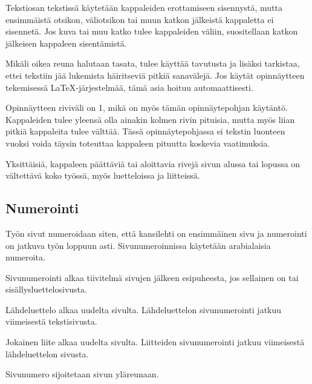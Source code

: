 Tekstiosan tekstissä käytetään kappaleiden erottamiseen sisennystä,
mutta ensimmäistä otsikon, väliotsikon tai muun katkon jälkeistä
kappaletta ei sisennetä. Jos kuva tai muu katko tulee kappaleiden
väliin, suositellaan katkon jälkeisen kappaleen sisentämistä.

Mikäli oikea reuna halutaan tasata, tulee käyttää tavutusta ja lisäksi
tarkistaa, ettei tekstiin jää lukemista häiritseviä pitkiä sanavälejä. Jos
käytät opinnäytteen tekemisessä \LaTeX-järjestelmää, 
tämä asia hoituu automaattisesti.

Opinnäytteen riviväli on 1, mikä on myös tämän opinnäytepohjan käytäntö. 
Kappaleiden tulee yleensä olla ainakin kolmen rivin pituisia, mutta
myös liian pitkiä kappaleita tulee välttää.  Tässä opinnäytepohjassa
ei tekstin luonteen vuoksi voida täysin toteuttaa kappaleen pituutta koskevia
vaatimuksia.

Yksittäisiä, kappaleen päättäviä tai aloittavia rivejä sivun alussa
tai lopussa on vältettävä koko työssä, myös luetteloissa ja
liitteissä.

\subsection{Numerointi}

Työn sivut numeroidaan siten, että kansilehti on ensimmäinen sivu ja 
numerointi on jatkuva työn loppuun asti. Sivunumeroinnissa 
käytetään arabialaisia numeroita.

Sivunumerointi alkaa tiivitelmä sivujen jälkeen esipuheesta, jos 
sellainen on tai sisällysluettelosivusta.

Lähdeluettelo alkaa uudelta sivulta. Lähdeluettelon sivunumerointi 
jatkuu viimeisestä tekstisivusta.

Jokainen liite alkaa uudelta sivulta. Liitteiden sivunumerointi
jatkuu viimeisestä lähdeluettelon sivusta.

Sivunumero sijoitetaan sivun yläreunaan.

